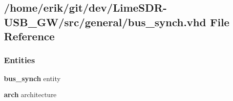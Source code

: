 \subsection{/home/erik/git/dev/\+Lime\+S\+D\+R-\/\+U\+S\+B\+\_\+\+G\+W/src/general/bus\+\_\+synch.vhd File Reference}
\label{bus__synch_8vhd}
\subsubsection*{Entities}
\begin{DoxyCompactItemize}
\item 
{\bf bus\+\_\+synch} entity
\item 
{\bf arch} architecture
\end{DoxyCompactItemize}

